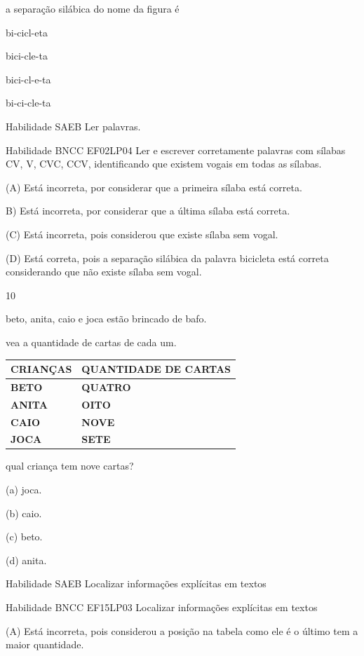 {{{{{{a separação silábica do nome da figura é

\begin{escolha}
\item bi-cicl-eta

\item bici-cle-ta

\item bici-cl-e-ta

\item bi-ci-cle-ta
\end{escolha}

Habilidade SAEB Ler palavras.

Habilidade BNCC EF02LP04 Ler e escrever corretamente palavras com
sílabas CV, V, CVC, CCV, identificando que existem vogais em todas as
sílabas.

(A) Está incorreta, por considerar que a primeira sílaba está correta.

B) Está incorreta, por considerar que a última sílaba está correta.

(C) Está incorreta, pois considerou que existe sílaba sem vogal.

(D) Está correta, pois a separação silábica da palavra bicicleta está
correta considerando que não existe sílaba sem vogal.

\num{10}

beto, anita, caio e joca estão brincado de bafo.

vea a quantidade de cartas de cada um.

\begin{longtable}[]{@{}ll@{}}
\toprule
\textbf{CRIANÇAS} & \textbf{QUANTIDADE DE CARTAS}\tabularnewline
\midrule
\endhead
\textbf{BETO} & \textbf{QUATRO}\tabularnewline
\textbf{ANITA} & \textbf{OITO}\tabularnewline
\textbf{CAIO} & \textbf{NOVE}\tabularnewline
\textbf{JOCA} & \textbf{SETE}\tabularnewline
\bottomrule
\end{longtable}

qual criança tem nove cartas?

(a) joca.

(b) caio.

(c) beto.

(d) anita.

Habilidade SAEB Localizar informações explícitas em textos

Habilidade BNCC EF15LP03 Localizar informações explícitas em textos

(A) Está incorreta, pois considerou a posição na tabela como ele é o
último tem a maior quantidade.

}}}}}}
